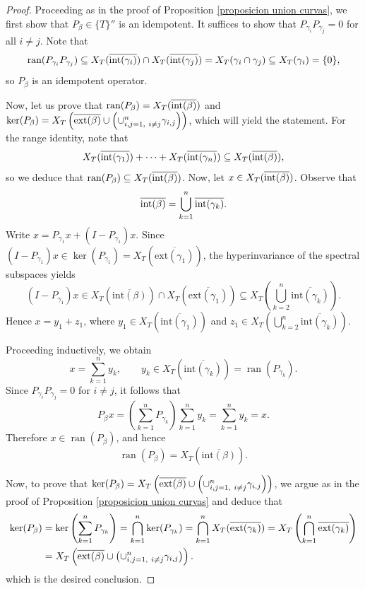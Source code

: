 \documentclass[11pt]{amsart}
\theoremstyle{definition}
\theoremstyle{remark}
\numberwithin{equation}{section}
\newcommand{\ran}{\textnormal{ran}}
\newcommand{\biconm}[1]{{\{#1\}''}}
\newcommand{\inte}{\textnormal{int}}
\newcommand{\exte}{\textnormal{ext}}
\begin{document}
\begin{proof}
Proceeding as in the proof of Proposition \ref{proposicion union curvas}, we first show that $P_\beta \in \biconm{T}$ is an idempotent. It suffices to show that $P_{\gamma_i}P_{\gamma_j}=0$ for all $i\neq j$. Note that
$$\ran(P_{\gamma_i}P_{\gamma_j}) \subseteq   X_T(\overline{\inte(\gamma_i)})\cap X_T(\overline{\inte(\gamma_j)}) = X_T(\gamma_i\cap \gamma_j) \subseteq   X_T(\gamma_i) = \{0\},$$ so $P_\beta$ is an idempotent operator.

\smallskip

Now, let us prove that $\ran(P_\beta) = X_T(\overline{\inte(\beta)})$ and $\ker(P_\beta) = X_T\left(\overline{\exte(\beta)}\cup \left(\cup_{i,j=1, \ i\neq j}^n \gamma_{i,j} \right) \right)$, which will yield the statement. For the range identity, note that
    $$
    X_T(\overline{\inte(\gamma_1)})+\cdots + X_T(\overline{\inte(\gamma_n)})\subseteq   X_T(\overline{\inte(\beta)}),
    $$ so we deduce that $\ran(P_\beta)\subseteq   X_T(\overline{\inte(\beta)})$. Now, let $x\in X_T(\overline{\inte(\beta)})$. Observe that
    $$
    \overline{\inte(\beta)} = \bigcup_{k=1}^n \overline{\inte(\gamma_k)}.
    $$
Write $x=P_{\gamma_1}x+(I-P_{\gamma_1})x$. Since $(I-P_{\gamma_1})x\in
\ker(P_{\gamma_1})=X_T(\overline{\mathrm{ext}(\gamma_1)})$, the hyperinvariance of the spectral subspaces yields
$$
(I-P_{\gamma_1})x\in X_T(\overline{\mathrm{int}(\beta)})\cap
X_T(\overline{\mathrm{ext}(\gamma_1)})
\subseteq X_T\!\left(\bigcup_{k=2}^n \overline{\mathrm{int}(\gamma_k)}\right).
$$
Hence $x=y_1+z_1$, where $y_1\in X_T(\overline{\mathrm{int}(\gamma_1)})$ and
$z_1\in X_T\!\left(\bigcup_{k=2}^n \overline{\mathrm{int}(\gamma_k)}\right)$.

\noindent Proceeding inductively, we obtain
$$
x=\sum_{k=1}^n y_k,
\qquad
y_k\in X_T(\overline{\mathrm{int}(\gamma_k)})=\operatorname{ran}(P_{\gamma_k}).
$$
Since $P_{\gamma_i}P_{\gamma_j}=0$ for $i\neq j$, it follows that
$$
P_\beta x
=\left(\sum_{k=1}^n P_{\gamma_k}\right)\sum_{k=1}^n y_k
=\sum_{k=1}^n y_k
=x.
$$
Therefore $x\in \operatorname{ran}(P_\beta)$, and hence
$$
\operatorname{ran}(P_\beta)=X_T(\overline{\mathrm{int}(\beta)}).
$$



Now, to prove that $\ker(P_\beta) = X_T\left(\overline{\exte(\beta)}\cup \left(\cup_{i,j=1, \ i\neq j}^n \gamma_{i,j} \right) \right)$, we argue as in the proof of Proposition \ref{proposicion union curvas} and deduce that
    \begin{equation*}
        \begin{split}
            \ker(P_\beta) &= \ker\left(\sum_{k=1}^n P_{\gamma_k}\right) = \bigcap\limits_{k=1}^n \ker(P_{\gamma_k}) = \bigcap\limits_{k=1}^n X_T(\overline{\exte(\gamma_k)})  = X_T\left(\bigcap\limits_{k=1}^n \overline{\exte(\gamma_k)} \right) \\& = X_T\left(\overline{\exte(\beta)}\cup \left(\cup_{i,j=1, \ i\neq j}^n \gamma_{i,j} \right) \right).
        \end{split}
    \end{equation*}
which is the desired conclusion.
\end{proof}
\end{document}
